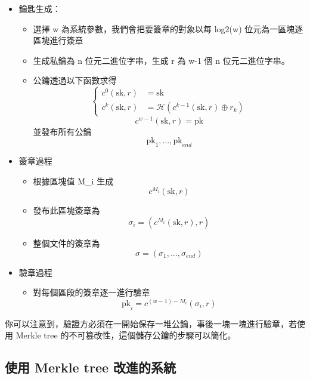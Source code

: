 \documentclass[
]{article}
\providecommand{\tightlist}{%
  \setlength{\itemsep}{0pt}\setlength{\parskip}{0pt}}
\begin{document}
\begin{itemize}
\tightlist
\item
  鑰匙生成：

  \begin{itemize}
  \tightlist
  \item
    選擇 w 為系統參數，我們會把要簽章的對象以每 log2(w)
    位元為一區塊逐區塊進行簽章
  \item
    生成私鑰為 n 位元二進位字串，生成 r 為 w-1 個 n 位元二進位字串。
  \item
    公鑰透過以下函數求得 \[
    \left\{\begin{aligned}
    c^{0}(\mathrm{sk}, r) &= \mathrm{sk}\\
    c^{k}(\mathrm{sk}, r) &= \mathcal{H}(c^{k-1}(\mathrm{sk},r) \oplus r_{k})
    \end{aligned}\right.
    \] \[
    c^{w-1}(\mathrm{sk},r) = \mathrm{pk}
    \] 並發布所有公鑰 \[
    \mathrm{pk}_{1},\dots,\mathrm{pk}_{end}
    \]
  \end{itemize}
\item
  簽章過程

  \begin{itemize}
  \tightlist
  \item
    根據區塊值 M\_i 生成 \[
    c^{M_{i}}(\mathrm{sk},r)
    \]
  \item
    發布此區塊簽章為 \[
    \sigma_{i} = (c^{M_{i}}(\mathrm{sk},r), r)
    \]
  \item
    整個文件的簽章為 \[
    \sigma = (\sigma_{1},\dots,\sigma_{end})
    \]
  \end{itemize}
\item
  驗章過程

  \begin{itemize}
  \tightlist
  \item
    對每個區段的簽章逐一進行驗章 \[
    \mathrm{pk}_{i}= c^{(w-1)-M_{i}}(\sigma_{i},r)
    \]
  \end{itemize}
\end{itemize}

你可以注意到，驗證方必須在一開始保存一堆公鑰，事後一塊一塊進行驗章，若使用
Merkle tree 的不可篡改性，這個儲存公鑰的步驟可以簡化。

\hypertarget{ux4f7fux7528-merkle-tree-ux6539ux9032ux7684ux7cfbux7d71}{%
\subsection{使用 Merkle tree
改進的系統}\label{ux4f7fux7528-merkle-tree-ux6539ux9032ux7684ux7cfbux7d71}}
\end{document}
